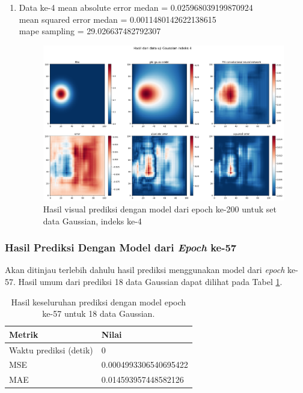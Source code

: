 \begin{enumerate}
    \item Data ke-4
    mean absolute error medan =  0.025968039199870924\\
    mean squared error medan = 0.0011480142622138615\\
    mape sampling =  29.026637482792307
    \begin{figure}[h!]
    \centering
    \includegraphics[width=12cm]{gambar/4_200_gaussian.png}
    \caption{Hasil visual prediksi dengan model dari epoch ke-200 untuk set data Gaussian, indeks ke-4}
    \label{4_200_gaussian}
    \end{figure}
    
\end{enumerate}

\subsubsection{Hasil Prediksi Dengan Model dari \textit{Epoch} ke-57}
Akan ditinjau terlebih dahulu hasil prediksi menggunakan model dari \textit{epoch} ke-57. Hasil umum dari prediksi 18 data Gaussian dapat dilihat pada Tabel \ref{57gaussian}.

\begin{table}[h!]
\centering
\caption{Hasil keseluruhan prediksi dengan model epoch ke-57 untuk 18 data Gaussian.}
\label{57gaussian}
\begin{tabular}{ll}
\hline
\textbf{Metrik}        & \textbf{Nilai}         \\ \hline
Waktu prediksi (detik) & 0                      \\ \hline
MSE                    & 0.0004993306540695422 \\ \hline
MAE                    & 0.014593957448582126     \\ \hline
\end{tabular}
\end{table}

